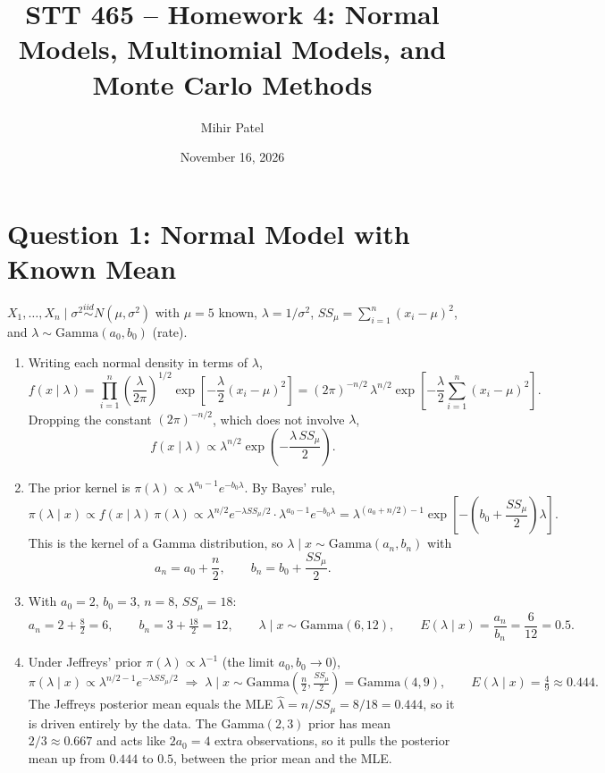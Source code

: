 \documentclass[11pt]{article}
\title{STT 465 -- Homework 4: Normal Models, Multinomial Models, and Monte Carlo Methods}
\author{Mihir Patel}
\date{November 16, 2026}
\begin{document}
\maketitle

\section*{Question 1: Normal Model with Known Mean}

$X_1,\dots,X_n \mid \sigma^2 \overset{iid}{\sim} N(\mu,\sigma^2)$ with $\mu = 5$ known, $\lambda = 1/\sigma^2$, $SS_\mu = \sum_{i=1}^n (x_i-\mu)^2$, and $\lambda \sim \text{Gamma}(a_0, b_0)$ (rate).

\begin{enumerate}
\item Writing each normal density in terms of $\lambda$,
\[
f(x \mid \lambda) = \prod_{i=1}^n \left(\frac{\lambda}{2\pi}\right)^{1/2} \exp\!\left[-\frac{\lambda}{2}(x_i-\mu)^2\right]
= (2\pi)^{-n/2}\,\lambda^{n/2} \exp\!\left[-\frac{\lambda}{2}\sum_{i=1}^n (x_i-\mu)^2\right].
\]
Dropping the constant $(2\pi)^{-n/2}$, which does not involve $\lambda$,
\[
f(x \mid \lambda) \propto \lambda^{n/2} \exp\!\left(-\frac{\lambda\, SS_\mu}{2}\right).
\]

\item The prior kernel is $\pi(\lambda) \propto \lambda^{a_0-1} e^{-b_0 \lambda}$. By Bayes' rule,
\[
\pi(\lambda \mid x) \propto f(x\mid\lambda)\,\pi(\lambda)
\propto \lambda^{n/2} e^{-\lambda SS_\mu/2}\cdot \lambda^{a_0-1} e^{-b_0\lambda}
= \lambda^{(a_0 + n/2) - 1} \exp\!\left[-\left(b_0 + \frac{SS_\mu}{2}\right)\lambda\right].
\]
This is the kernel of a Gamma distribution, so $\lambda \mid x \sim \text{Gamma}(a_n, b_n)$ with
\[
a_n = a_0 + \frac{n}{2}, \qquad b_n = b_0 + \frac{SS_\mu}{2}.
\]

\item With $a_0 = 2$, $b_0 = 3$, $n = 8$, $SS_\mu = 18$:
\[
a_n = 2 + \tfrac{8}{2} = 6, \qquad b_n = 3 + \tfrac{18}{2} = 12,
\qquad \lambda \mid x \sim \text{Gamma}(6, 12),
\qquad E(\lambda \mid x) = \frac{a_n}{b_n} = \frac{6}{12} = 0.5.
\]

\item Under Jeffreys' prior $\pi(\lambda) \propto \lambda^{-1}$ (the limit $a_0, b_0 \to 0$),
\[
\pi(\lambda\mid x) \propto \lambda^{n/2-1} e^{-\lambda SS_\mu/2}
\;\Longrightarrow\;
\lambda \mid x \sim \text{Gamma}\!\left(\tfrac{n}{2}, \tfrac{SS_\mu}{2}\right) = \text{Gamma}(4, 9),
\qquad E(\lambda\mid x) = \tfrac{4}{9} \approx 0.444.
\]
The Jeffreys posterior mean equals the MLE $\hat\lambda = n/SS_\mu = 8/18 = 0.444$, so it is driven entirely by the data. The Gamma$(2,3)$ prior has mean $2/3 \approx 0.667$ and acts like $2a_0 = 4$ extra observations, so it pulls the posterior mean up from $0.444$ to $0.5$, between the prior mean and the MLE.


\end{enumerate}
\end{document}
